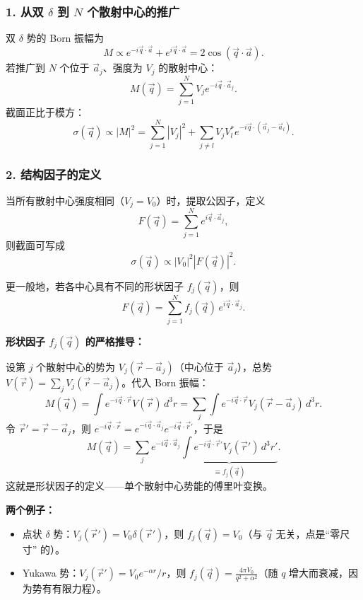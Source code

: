 \begin{derivationbox}

\subsubsection*{1. 从双 $\delta$ 到 $N$ 个散射中心的推广}

双 $\delta$ 势的 Born 振幅为
\[
M \propto e^{-i\vec{q}\cdot\vec{a}} + e^{i\vec{q}\cdot\vec{a}} = 2\cos(\vec{q}\cdot\vec{a}).
\]
若推广到 $N$ 个位于 $\vec{a}_j$、强度为 $V_j$ 的散射中心：
\[
M(\vec{q}) = \sum_{j=1}^N V_j e^{-i\vec{q}\cdot\vec{a}_j}.
\]
截面正比于模方：
\[
\sigma(\vec{q}) \propto |M|^2 = \sum_{j=1}^N |V_j|^2 + \sum_{j\neq l} V_j V_l^* e^{-i\vec{q}\cdot(\vec{a}_j - \vec{a}_l)}.
\]

\subsubsection*{2. 结构因子的定义}

当所有散射中心强度相同（$V_j = V_0$）时，提取公因子，定义
\[
F(\vec{q}) = \sum_{j=1}^N e^{i\vec{q}\cdot\vec{a}_j},
\]
则截面可写成
\[
\sigma(\vec{q}) \propto |V_0|^2 |F(\vec{q})|^2.
\]

更一般地，若各中心具有不同的形状因子 $f_j(\vec{q})$，则
\[
F(\vec{q}) = \sum_{j=1}^N f_j(\vec{q}) \, e^{i\vec{q}\cdot\vec{a}_j}.
\]

\textbf{形状因子 $f_j(\vec{q})$ 的严格推导：}

设第 $j$ 个散射中心的势为 $V_j(\vec{r} - \vec{a}_j)$（中心位于 $\vec{a}_j$），总势 $V(\vec{r}) = \sum_j V_j(\vec{r} - \vec{a}_j)$。代入 Born 振幅：
\[
M(\vec{q}) = \int e^{-i\vec{q}\cdot\vec{r}} V(\vec{r}) \, d^3r = \sum_j \int e^{-i\vec{q}\cdot\vec{r}} V_j(\vec{r} - \vec{a}_j) \, d^3r.
\]
令 $\vec{r}' = \vec{r} - \vec{a}_j$，则 $e^{-i\vec{q}\cdot\vec{r}} = e^{-i\vec{q}\cdot\vec{a}_j} e^{-i\vec{q}\cdot\vec{r}'}$，于是
\[
M(\vec{q}) = \sum_j e^{-i\vec{q}\cdot\vec{a}_j} \underbrace{\int e^{-i\vec{q}\cdot\vec{r}'} V_j(\vec{r}') \, d^3r'}_{\equiv f_j(\vec{q})}.
\]
这就是形状因子的定义——单个散射中心势能的傅里叶变换。

\textbf{两个例子：}
\begin{itemize}
    \item 点状 $\delta$ 势：$V_j(\vec{r}') = V_0\delta(\vec{r}')$，则 $f_j(\vec{q}) = V_0$（与 $\vec{q}$ 无关，点是``零尺寸'' 的）。
    \item Yukawa 势：$V_j(\vec{r}') = V_0 e^{-\alpha r}/r$，则 $f_j(\vec{q}) = \frac{4\pi V_0}{q^2 + \alpha^2}$（随 $q$ 增大而衰减，因为势有有限力程）。
\end{itemize}


\end{derivationbox}
